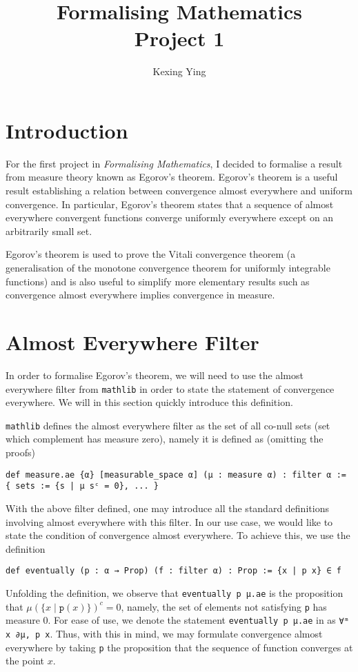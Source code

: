 \documentclass[]{article}
\title{Formalising Mathematics\\
  \large Project 1}
\author{Kexing Ying}
\theoremstyle{definition}
\begin{document}
\maketitle

\section*{Introduction}

For the first project in \textit{Formalising Mathematics}, I decided to formalise a result from 
measure theory known as Egorov's theorem. Egorov's theorem is a useful result establishing a 
relation between convergence almost everywhere and uniform convergence. In particular, 
Egorov's theorem states that a sequence of almost everywhere convergent functions 
converge uniformly everywhere except on an arbitrarily small set.

Egorov's theorem is used to prove the Vitali convergence theorem 
(a generalisation of the monotone convergence theorem for uniformly integrable functions)
and is also useful to simplify more elementary results such as convergence almost 
everywhere implies convergence in measure. 

\section*{Almost Everywhere Filter}

In order to formalise Egorov's theorem, we will need to use the almost everywhere 
filter from \texttt{mathlib} in order to state the statement of convergence everywhere. 
We will in this section quickly introduce this definition. 

\texttt{mathlib} defines the almost everywhere filter as the set of all 
co-null sets (set which complement has measure zero), namely it is defined as
(omitting the proofs)
\begin{verbatim}
def measure.ae {α} [measurable_space α] (μ : measure α) : filter α :=
{ sets := {s | μ sᶜ = 0}, ... }
\end{verbatim}
With the above filter defined, one may introduce all the standard definitions involving 
almost everywhere with this filter. In our use case, we would like to state the 
condition of convergence almost everywhere. To achieve this, we use the definition
\begin{verbatim}
def eventually (p : α → Prop) (f : filter α) : Prop := {x | p x} ∈ f
\end{verbatim}
Unfolding the definition, we observe that \texttt{eventually p μ.ae} is 
the proposition that \(\mu(\{x \mid \mathtt{p}(x)\})^c = 0\), namely, 
the set of elements not satisfying \texttt{p} has measure 0. For ease of use, 
we denote the statement \texttt{eventually p μ.ae} in 
as \texttt{∀ᵐ x ∂μ, p x}. Thus, with this in mind, we may formulate 
convergence almost everywhere by taking \texttt{p} the proposition that the 
sequence of function converges at the point \(x\).
\end{document}
